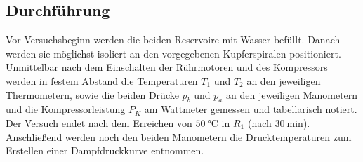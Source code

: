 \subsection{Durchführung}
Vor Versuchsbeginn werden die beiden Reservoire mit %
Wasser befüllt.
Danach werden sie möglichst isoliert an den vorgegebenen Kupferspiralen positioniert.
Unmittelbar nach dem Einschalten der Rührmotoren und des Kompressors werden in festem Abstand die Temperaturen $T_1$ und $T_2$ an den jeweiligen Thermometern, sowie die beiden Drücke $ p_b $ und $ p_a $ an den jeweiligen Manometern und die Kompressorleistung $ P_K $ am Wattmeter gemessen und tabellarisch notiert.\\
Der Versuch endet nach dem Erreichen von $ \SI{50}{\celsius} $ in $ R_1 $ (nach $ \SI{30}{\minute} $).
Anschließend werden noch den beiden Manometern die Drucktemperaturen zum Erstellen einer Dampfdruckkurve entnommen.
\label{sec:Durchführung}
